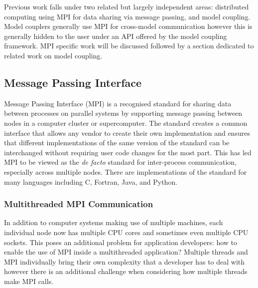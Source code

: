 \documentclass{acm_proc_article-sp}
\begin{document}
Previous work falls under two related but largely independent areas: distributed
computing using MPI for data sharing via message passing, and model coupling.
Model couplers generally use MPI for cross-model communication however this is
generally hidden to the user under an API offered by the model coupling
framework. MPI specific work will be discussed followed by a section dedicated
to related work on model coupling.

\subsection{Message Passing Interface}

Message Passing Interface (MPI) is a recognised standard for sharing data
between processes on parallel systems by supporting message passing between
nodes in a computer cluster or supercomputer. The standard creates a common
interface that allows any vendor to create their own implementation and ensures
that different implementations of the same version of the standard can be
interchanged without requiring user code changes for the most part. This has led
MPI to be viewed as the \textit{de facto} standard for inter-process
communication, especially across multiple nodes. There are implementations of
the standard for many languages including C, Fortran, Java, and Python.

\subsubsection{Multithreaded MPI Communication}

In addition to computer systems making use of multiple machines, each individual
node now has multiple CPU cores and sometimes even multiple CPU sockets. This
poses an additional problem for application developers: how to enable the use of
MPI inside a multithreaded application? Multiple threads and MPI individually
bring their own complexity that a developer has to deal with however there is an
additional challenge when considering how multiple threads make MPI calls.
\end{document}
